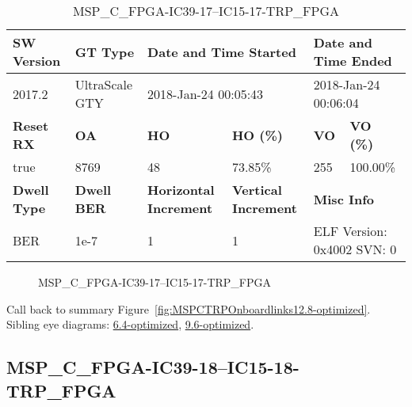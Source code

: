 \begin{table}[h]
\centering
\caption{MSP\_C\_FPGA-IC39-17--IC15-17-TRP\_FPGA}
\label{tab:MSPCFPGAIC3917IC1517TRPFPGA12.8-optimized}
\begin{tabular}{@{}|l|l|l|l|l|l|@{}}
\toprule
\textbf{SW Version}                & \textbf{GT Type}   & \multicolumn{2}{l|}{\textbf{Date and Time Started}}            & \multicolumn{2}{l|}{\textbf{Date and Time Ended}}        \\ \midrule
2017.2                       & UltraScale GTY          & \multicolumn{2}{l|}{2018-Jan-24 00:05:43}                   & \multicolumn{2}{l|}{2018-Jan-24 00:06:04}               \\ \midrule
\textbf{Reset RX}                  & \textbf{OA} & \textbf{HO}   & \textbf{HO (\%)} & \textbf{VO} & \textbf{VO (\%)} \\ \midrule
true & 8769        & 48          & 73.85\%        & 255        & 100.00\%       \\ \midrule
\textbf{Dwell Type}                & \textbf{Dwell BER} & \textbf{Horizontal Increment} & \textbf{Vertical Increment}    & \multicolumn{2}{l|}{\textbf{Misc Info}}                  \\ \midrule
BER                            & 1e-7        & 1        & 1           & \multicolumn{2}{l|}{ELF Version: 0x4002 SVN: 0}                         \\ \bottomrule
\end{tabular}
\end{table}

\begin{figure}[h]
\caption{MSP\_C\_FPGA-IC39-17--IC15-17-TRP\_FPGA} \label{fig:MSPCFPGAIC3917IC1517TRPFPGA12.8-optimized}
\end{figure}

Call back to summary Figure~\ref{fig:MSPCTRPOnboardlinks12.8-optimized}.
Sibling eye diagrams: \hyperref[sec:MSPCFPGAIC3917IC1517TRPFPGA6.4-optimized]{6.4-optimized}, \hyperref[sec:MSPCFPGAIC3917IC1517TRPFPGA9.6-optimized]{9.6-optimized}.

\clearpage
\newpage


\subsection{MSP\_C\_FPGA-IC39-18--IC15-18-TRP\_FPGA}\label{sec:MSPCFPGAIC3918IC1518TRPFPGA12.8-optimized}

